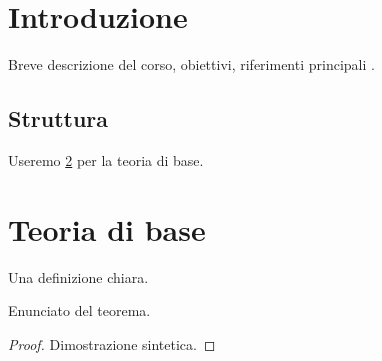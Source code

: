 \section{Introduzione}
Breve descrizione del corso, obiettivi, riferimenti principali .

\subsection{Struttura}
Useremo \cref{sec:teoria-base} per la teoria di base.

\section{Teoria di base}\label{sec:teoria-base}
\begin{definition}
Una definizione chiara.
\end{definition}

\begin{theorem}[Importante]\label{thm:importante}
Enunciato del teorema.
\end{theorem}
\begin{proof}
Dimostrazione sintetica.
\end{proof}